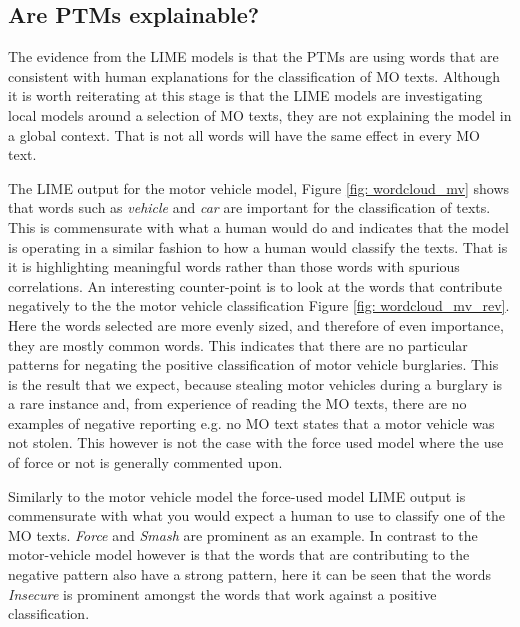 \subsection{Are PTMs explainable?} The evidence from the LIME models is that the PTMs are using words that are consistent with human explanations for the classification of MO texts. Although it is worth reiterating at this stage is that the LIME models are investigating local models around a selection of MO texts, they are not explaining the model in a global context. That is not all words will have the same effect in every MO text. 

The LIME output for the motor vehicle model, Figure \ref{fig: wordcloud_mv} shows that words such as \emph{vehicle} and \emph{car} are important for the classification of texts. This is commensurate with what a human would do and indicates that the model is operating in a similar fashion to how a human would classify the texts. That is it is highlighting meaningful words rather than those words with spurious correlations. An interesting counter-point is to look at the words that contribute negatively to the the motor vehicle classification Figure \ref{fig: wordcloud_mv_rev}. Here the words selected are more evenly sized, and therefore of even importance, they are mostly common words. This indicates that there are no particular patterns for negating the positive classification of motor vehicle burglaries. This is the result that we expect, because stealing motor vehicles during a burglary is a rare instance and, from experience of reading the MO texts, there are no examples of negative reporting e.g. no MO text states that a motor vehicle was not stolen. This however is not the case with the force used model where the use of force or not is generally commented upon.

Similarly to the motor vehicle model the force-used model LIME output is commensurate with what you would expect a human to use to classify one of the MO texts. \emph{Force} and \emph{Smash} are prominent as an example. In contrast to the motor-vehicle model however is that the words that are contributing to the negative pattern also have a strong pattern, here it can be seen that the words \emph{Insecure} is prominent amongst the words that work against a positive classification. 

